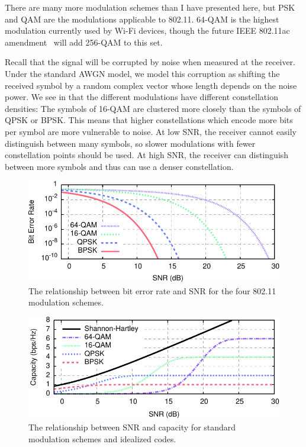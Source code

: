 There are many more modulation schemes than I have presented here, but PSK and QAM are the modulations applicable to 802.11.
64-QAM is the highest modulation currently used by Wi-Fi devices, though the future IEEE 802.11ac amendment~\cite{80211ac} will add 256-QAM to this set.

Recall that the signal will be corrupted by noise when measured at the receiver. Under the standard AWGN model, we model this corruption as shifting the received symbol by a random complex vector whose length depends on the noise power. We see in  that the different modulations have different constellation densities: The symbols of 16-QAM are clustered more closely than the symbols of QPSK or BPSK. This means that higher constellations which encode more bits per symbol are more vulnerable to noise. At low SNR, the receiver cannot easily distinguish between many symbols, so slower modulations with fewer constellation points should be used. At high SNR, the receiver can distinguish between more symbols and thus can use a denser constellation.

\begin{figure}[t]
\centering
\includegraphics{calculations/snr_ber}
\caption[BER vs SNR for the four 802.11n modulation schemes]{\label{fig:mod_ber_snr}The relationship between bit error rate and SNR for the four 802.11 modulation schemes.}
\end{figure}

\begin{figure}[t]
\centering
\includegraphics{calculations/snr_bits}
\caption[Capacity vs SNR for 802.11n modulation and coding schemes]{\label{fig:mod_bits_snr}The relationship between SNR and capacity for standard modulation schemes and idealized codes.}
\end{figure}

